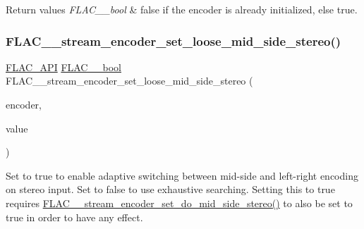 \begin{DoxyRetVals}{Return values}
{\em F\+L\+A\+C\+\_\+\+\_\+bool} & {\ttfamily false} if the encoder is already initialized, else {\ttfamily true}. \\
\hline
\end{DoxyRetVals}
\mbox{\label{group__flac__stream__encoder_ga7b7d294dccd5df7c6c67e75f59798f48}} 
\subsubsection{\texorpdfstring{F\+L\+A\+C\+\_\+\+\_\+stream\+\_\+encoder\+\_\+set\+\_\+loose\+\_\+mid\+\_\+side\+\_\+stereo()}{FLAC\_\_stream\_encoder\_set\_loose\_mid\_side\_stereo()}}
{\footnotesize\ttfamily \hyperlink{group__flac__export_ga56ca07df8a23310707732b1c0007d6f5}{F\+L\+A\+C\+\_\+\+A\+PI} \hyperlink{ordinals_8h_a95103469f1cbd78b8cf250194985b34e}{F\+L\+A\+C\+\_\+\+\_\+bool} F\+L\+A\+C\+\_\+\+\_\+stream\+\_\+encoder\+\_\+set\+\_\+loose\+\_\+mid\+\_\+side\+\_\+stereo (\begin{DoxyParamCaption}\item[{\hyperlink{struct_f_l_a_c_____stream_encoder}{F\+L\+A\+C\+\_\+\+\_\+\+Stream\+Encoder} $\ast$}]{encoder,  }\item[{\hyperlink{ordinals_8h_a95103469f1cbd78b8cf250194985b34e}{F\+L\+A\+C\+\_\+\+\_\+bool}}]{value }\end{DoxyParamCaption})}

Set to {\ttfamily true} to enable adaptive switching between mid-\/side and left-\/right encoding on stereo input. Set to {\ttfamily false} to use exhaustive searching. Setting this to {\ttfamily true} requires \hyperlink{group__flac__stream__encoder_gadbd1084da109cf0ddd007a5c64027504}{F\+L\+A\+C\+\_\+\+\_\+stream\+\_\+encoder\+\_\+set\+\_\+do\+\_\+mid\+\_\+side\+\_\+stereo()} to also be set to {\ttfamily true} in order to have any effect.

